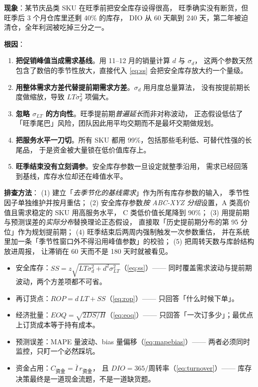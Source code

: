 \begin{pitfall}
\textbf{现象}：某节庆品类 SKU 在旺季前把安全库存设得很高，
旺季确实没有断货，但旺季后 3 个月仓库里还剩 40\% 的库存，
DIO 从 60 天飙到 240 天，第二年被迫清仓，全年利润被吃掉三分之一。

\textbf{根因}：
\begin{enumerate}
  \item \textbf{把促销峰值当成需求基线}。用 11--12 月的销量计算 $d$ 与 $\sigma_d$，
        这两个参数天然包含了数倍的季节性放大，直接代入 \cref{eq:ss} 会把安全库存放大约一个量级。
  \item \textbf{用整体需求方差代替提前期需求方差}。$\sigma_d$ 用月度总量算法，
        没有按提前期长度做缩放，导致 $LT\sigma_d^2$ 项偏大。
  \item \textbf{忽略 $\sigma_{LT}$ 的方向性}。旺季提前期\emph{普遍延长}而非对称波动，
        正态假设低估了「旺季尾巴」风险，团队因此用平均交期而不是最坏交期做规划。
  \item \textbf{把服务水平一刀切}。所有 SKU 都用 99\%，包括那些毛利低、可替代性强的长尾品，
        于是资金被大量锁在低价值库存上。
  \item \textbf{旺季结束没有立刻调参}。安全库存参数一旦设定就整季沿用，
        需求已经回落到基线，库存水位却还在峰值水平。
\end{enumerate}

\textbf{排查方法}：
(1) 建立「\emph{去季节化的基线需求}」作为所有库存参数的输入，
季节性因子单独维护并按月重估；
(2) 安全库存参数\emph{按 ABC-XYZ 分组}设置，A 类高价值且需求稳定的 SKU 用高服务水平，
C 类低价值长尾降到 90\%；
(3) 用提前期与预测误差的\emph{实际分布}替换理论正态假设，
直接取「历史提前期分布的第 95 分位」作为规划提前期；
(4) 旺季结束后两周内强制触发一次参数重估，
并在系统里加一条「季节性窗口外不得沿用峰值参数」的校验；
(5) 把周转天数与库龄结构放进周报，
让滞销在 60 天而不是 180 天时就被看见。
\end{pitfall}

\begin{formulacard}[库存计划的五个核心量]
\begin{itemize}
  \item 安全库存：$SS = z\sqrt{LT\sigma_d^2 + d^2\sigma_{LT}^2}$（\cref{eq:ss}）——
        同时覆盖需求波动与提前期波动，两个方差项都不可省。
  \item 再订货点：$ROP = d\,LT + SS$（\cref{eq:rop}）——
        只回答「什么时候下单」。
  \item 经济批量：$EOQ = \sqrt{2DS/H}$（\cref{eq:eoq}）——
        只回答「一次订多少」；最优点上订货成本等于持有成本。
  \item 预测误差：MAPE 量波动、bias 量偏移（\cref{eq:mapebias}）——
        两者必须同时监控，只盯一个必然踩坑。
  \item 资金占用：$C_{\text{资金}} = \overline{I}\, r_{\text{资金}}$，
        且 $DIO = 365/\text{周转率}$（\cref{eq:turnover}）——
        库存决策最终是一道现金流题，不是一道缺货题。
\end{itemize}
\end{formulacard}

